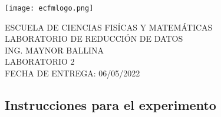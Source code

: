 \documentclass[
]{article}
\author{}
\date{\vspace{-2.5em}}
\begin{document}
\newcommand{\hoofding}[5]{
\begin{flushleft}
\texttt{[image: ecfmlogo.png]}
\end{flushleft}
\vspace{-2.5cm}
\hspace{2.5cm} 
\parbox{12cm}{ #1\\#2\\#3\\#4\\#5} 

{\parindent=0pt \hrulefill} 
\vspace{1mm}}

\newcommand{\encabezadorep}[9]{
\begin{flushleft}
\texttt{[image: ecfmlogo.png]}
\end{flushleft}
\vspace{-2.7cm}
\hspace{2.5cm} 
\parbox{12cm}{ #1\\#2\\#3\\#4 \hspace{0.6cm} #5\\#6 \hspace{0.6cm} #7\\#8 \hspace{0.6cm} #9} 

{\parindent=0pt \hrulefill} 
\vspace{1mm}}

\begin{flushleft}
\texttt{[image: ecfmlogo.png]}
\end{flushleft}
\vspace{-2.5cm}
\hspace{2.5cm} 
\parbox{12cm}{ ESCUELA DE CIENCIAS FISÍCAS Y MATEMÁTICAS\\LABORATORIO DE REDUCCIÓN DE DATOS\\ING. MAYNOR BALLINA\\LABORATORIO 2\\FECHA DE ENTREGA: 06/05/2022} 

{\parindent=0pt \hrulefill} 
\vspace{1mm}

\vspace{-1em}

\subsection{\texorpdfstring{\textbf{Instrucciones para el experimento
}}{Instrucciones para el experimento }}\label{instrucciones-para-el-experimento}
\end{document}
